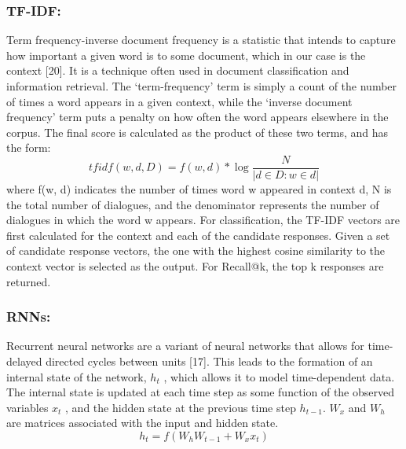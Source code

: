 \documentclass[letterpaper] {article} %
\begin{document}
\subsubsection{TF-IDF:}
Term frequency-inverse document frequency is a statistic that intends to capture how important a given word is to some document, which in our case is the context [20]. It is a technique often used in document classification and information retrieval. The ‘term-frequency’ term is simply a count of the number of times a word appears in a given context, while the ‘inverse document frequency’ term puts a penalty on how often the word appears elsewhere in the corpus. The final score is calculated as the product of these two terms, and has the form: 
$$
tfidf(w,d,D) = f(w,d)* \log\frac{N}{|{d \in D:w \in d}|} 
$$
where f(w, d) indicates the number of times word w appeared in context d, N is the total number of dialogues, and the denominator represents the number of dialogues in which the word w appears. For classification, the TF-IDF vectors are first calculated for the context and each of the candidate responses. Given a set of candidate response vectors, the one with the highest cosine similarity to the context vector is selected as the output. For Recall@k, the top k responses are returned. 

\subsubsection{RNNs:}
Recurrent neural networks are a variant of neural networks that allows for time-delayed directed cycles between units [17]. This leads to the formation of an internal state of the network, $h_t$ , which allows it to model time-dependent data. The internal state is updated at each time step as some function of the observed variables $x_t$ , and the hidden state at the previous time step $h_{t-1}$. $W_x$ and $W_h$ are matrices associated with the input and hidden state.
$$
h_t = f(W_h W_{t-1} + W_x x_t)
$$
\end{document}
